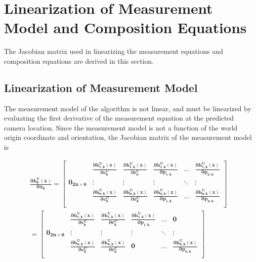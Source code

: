\chapter{Linearization of Measurement Model and Composition Equations}\label{ch:appendix3}
The Jacobian matrix used in linearizing the measurement equations and
composition equations are derived in this section. 

\section{Linearization of Measurement Model}
\label{sec:jac_measurement}
The measurement model of the algorithm is not linear, and must be
linearized by evaluating the first derivative of the measurement equation
at the predicted camera location. Since the measurement model is not a
function of the world origin coordinate and orientation, the Jacobian
matrix of the measurement model is

\begin{multline}
\boldsymbol{\frac{\partial h_{k}^{U}(x)}{\partial x_k}}=
\begin{bmatrix}
& 
\boldsymbol{\frac{\partial h_{1,k}^{U}(x)}{\partial c_k^{C}}} &
\boldsymbol{\frac{\partial h_{1,k}^{U}(x)}{\partial r_k^{C}}} &
\boldsymbol{\frac{\partial h_{1,k}^{U}(x)}{\partial p_{1,k}}} & 
\ldots & 
\boldsymbol{\frac{\partial h_{1,k}^{U}(x)}{\partial p_{n,k}}}\\
\boldsymbol{0_{2n\times 6}} & \vdots & \vdots & \vdots & \ddots &
\vdots \\
& 
\boldsymbol{\frac{\partial h_{n,k}^{U}(x)}{\partial c_k^{C}}} &
\boldsymbol{\frac{\partial h_{n,k}^{U}(x)}{\partial r_k^{C}}} &
\boldsymbol{\frac{\partial h_{n,k}^{U}(x)}{\partial p_{1,k}}} & 
\ldots & 
\boldsymbol{\frac{\partial h_{n,k}^{U}(x)}{\partial p_{n,k}}}\\
\end{bmatrix} \\
= \begin{bmatrix}
& 
\boldsymbol{\frac{\partial h_{1,k}^{U}(x)}{\partial c_k^{C}}} &
\boldsymbol{\frac{\partial h_{1,k}^{U}(x)}{\partial r_k^{C}}} &
\boldsymbol{\frac{\partial h_{1,k}^{U}(x)}{\partial p_{1,k}}} & 
\ldots & 
\boldsymbol{0}\\
\boldsymbol{0_{2n\times 6}} & \vdots & \vdots & \vdots & \ddots &
\vdots \\
& 
\boldsymbol{\frac{\partial h_{n,k}^{U}(x)}{\partial c_k^{C}}} &
\boldsymbol{\frac{\partial h_{n,k}^{U}(x)}{\partial r_k^{C}}} &
\boldsymbol{0} & 
\ldots & 
\boldsymbol{\frac{\partial h_{n,k}^{U}(x)}{\partial p_{n,k}}}\\
\end{bmatrix} 
\end{multline}


